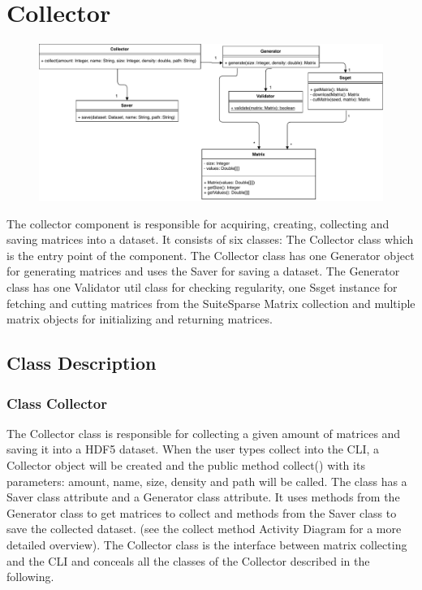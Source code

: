 \documentclass[parskip=full]{scrartcl}
\begin{document}
\section{Collector}
\begin{figure}[h]
\begin{center}
\includegraphics[width=\textwidth, height= \textheight, keepaspectratio]{ClassDiagrams/PDF/Collector_classdiagram.pdf}
%
\label{Activity Diagrams}
\end{center}
\end{figure}

The collector component is responsible for acquiring, creating, collecting and saving matrices into a dataset.
It consists of six classes:
The Collector class which is the entry point of the component.
The Collector class has one Generator object for generating matrices and uses the Saver for saving a dataset.
The Generator class has one Validator util class for checking regularity, one Ssget instance for fetching and cutting matrices from the SuiteSparse Matrix collection and multiple matrix objects for initializing and returning matrices.

\subsection{Class Description}

\subsubsection{Class Collector}
The Collector class is responsible for collecting a given amount of matrices and saving it into a \gls{HDF5} dataset.
When the user types collect into the \gls{CLI}, a Collector object will be created and the public method collect() with its parameters:
amount, name, size, density and path
will be called. 
The class has a Saver class attribute and a Generator class attribute.
It uses methods from the Generator class to get matrices to collect and methods from the Saver class to save the collected dataset.
(see the collect method Activity Diagram for a more detailed overview).
The Collector class is the interface between matrix collecting and the \gls{CLI} and conceals all the classes of the Collector described in the following.
\end{document}
